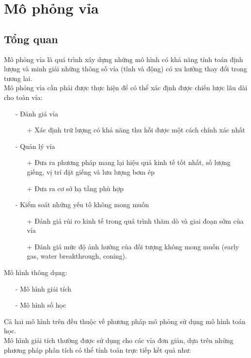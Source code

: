 \documentclass[12pt,a4paper]{report}
\begin{document}
\section{Mô phỏng vỉa}
\subsection{Tổng quan}
Mô phỏng vỉa là quá trình xây dựng những mô hình có khả năng tính toán định lượng và minh giải những thông số vỉa (tĩnh và động) có xu hướng thay đổi trong tương lai.\\
Mô phỏng vỉa cần phải được thực hiện để có thể xác định được chiến lược lâu dài cho toàn vỉa:
	\begin{itemize}
    	\item[-] Đánh giá vỉa
        	\begin{itemize}
            	\item[+] Xác định trữ lượng có khả năng thu hồi được một cách chính xác nhất
            \end{itemize}
        \item[-] Quản lý vỉa
        	\begin{itemize}
            	\item[+] Đưa ra phương pháp mang lại hiệu quả kinh tế tốt nhất, số lượng giếng, vị trí đặt giếng và lưu lượng bơm ép
                \item[+] Đưa ra cơ sở hạ tầng phù hợp
            \end{itemize}
		\item[-] Kiểm soát những yếu tố không mong muốn
        	\begin{itemize}
            	\item[+] Đánh giá rủi ro kinh tế trong quá trình thăm dò và giai đoạn sớm của vỉa
                \item[+] Đánh giá mức độ ảnh hưởng của đối tượng không mong muốn (early gas, water breakthrough, coning).
            \end{itemize}
    \end{itemize}
Mô hình thông dụng:
	\begin{itemize}
    	\item[-] Mô hình giải tích
        \item[-] Mô hình số học
    \end{itemize}
Cả hai mô hình trên đều thuộc về phương pháp mô phỏng sử dụng mô hình toán học.\\
Mô hình giải tích thường được sử dụng cho các vỉa đơn giản, dựa trên những phương pháp phân tích có thể tính toán trực tiếp kết quả như:
\end{document}
